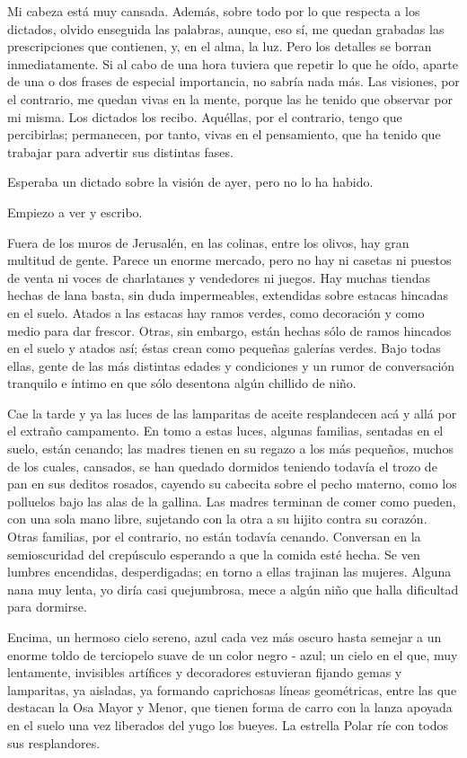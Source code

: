 \documentclass[12pt, twoside, openright]{book} %
\begin{document}
Mi cabeza está muy cansada. Además, sobre todo por lo que respecta a los dictados, olvido enseguida las palabras, aunque, eso sí, me quedan grabadas las prescripciones que contienen, y, en el alma, la luz. Pero los detalles se borran inmediatamente. Si al cabo de una hora tuviera que repetir lo que he oído, aparte de una o dos frases de especial importancia, no sabría nada más. Las visiones, por el contrario, me quedan vivas en la mente, porque las he tenido que observar por mi misma. Los dictados los recibo. Aquéllas, por el contrario, tengo que percibirlas; permanecen, por tanto, vivas en el pensamiento, que ha tenido que trabajar para advertir sus distintas fases. 

Esperaba un dictado sobre la visión de ayer, pero no lo ha habido. 

Empiezo a ver y escribo. 

Fuera de los muros de Jerusalén, en las colinas, entre los olivos, hay gran multitud de gente. Parece un enorme mercado, pero no hay ni casetas ni puestos de venta ni voces de charlatanes y vendedores ni juegos. Hay muchas tiendas hechas de lana basta, sin duda impermeables, extendidas sobre estacas hincadas en el suelo. Atados a las estacas hay ramos verdes, como decoración y como medio para dar frescor. Otras, sin embargo, están hechas sólo de ramos hincados en el suelo y atados así; éstas crean como pequeñas galerías verdes. Bajo todas ellas, gente de las más distintas edades y condiciones y un rumor de conversación tranquilo e íntimo en que sólo desentona algún chillido de niño. 

Cae la tarde y ya las luces de las lamparitas de aceite resplandecen acá y allá por el extraño campamento. En tomo a estas luces, algunas familias, sentadas en el suelo, están cenando; las madres tienen en su regazo a los más pequeños, muchos de los cuales, cansados, se han quedado dormidos teniendo todavía el trozo de pan en sus deditos rosados, cayendo su cabecita sobre el pecho materno, como los polluelos bajo las alas de la gallina. Las madres terminan de comer como pueden, con una sola mano libre, sujetando con la otra a su hijito contra su corazón. Otras familias, por el contrario, no están todavía cenando. Conversan en la semioscuridad del crepúsculo esperando a que la comida esté hecha. Se ven lumbres encendidas, desperdigadas; en torno a ellas trajinan las mujeres. Alguna nana muy lenta, yo diría casi quejumbrosa, mece a algún niño que halla dificultad para dormirse. 

Encima, un hermoso cielo sereno, azul cada vez más oscuro hasta semejar a un enorme toldo de terciopelo suave de un color negro - azul; un cielo en el que, muy lentamente, invisibles artífices y decoradores estuvieran fijando gemas y lamparitas, ya aisladas, ya formando caprichosas líneas geométricas, entre las que destacan la Osa Mayor y Menor, que tienen forma de carro con la lanza apoyada en el suelo una vez liberados del yugo los bueyes. La estrella Polar ríe con todos sus resplandores. 
\end{document}

